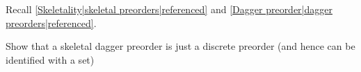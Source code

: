 

Recall \ref{Skeletality|skeletal preorders|referenced} and \ref{Dagger preorder|dagger preorders|referenced}.

Show that a skeletal dagger preorder is just a discrete preorder (and hence can be identified with a set)